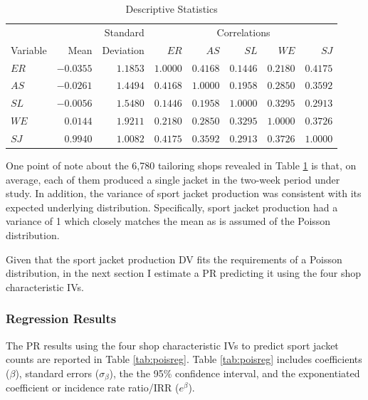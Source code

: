 \documentclass[man]{apa7}
\begin{document}
	\begin{table}[h!]
		\centering
		\caption{\centering Descriptive Statistics} 
		\begin{tabular}{lrr|rrrrr}
			\hline %
			&  & Standard & \multicolumn{5}{c}{Correlations} \\ 
			Variable & Mean & Deviation & $ER$ & $AS$ & $SL$ & $WE$ & $SJ$ \\ 
			\hline %
			$ER$ & $-0.0355$ & $1.1853$ & $1.0000$ & $0.4168$ & $0.1446$ & $0.2180$ & $0.4175$ \\ 
			$AS$ & $-0.0261$ & $1.4494$ & $0.4168$ & $1.0000$ & $0.1958$ & $0.2850$ & $0.3592$ \\ 
			$SL$ & $-0.0056$ & $1.5480$ & $0.1446$ & $0.1958$ & $1.0000$ & $0.3295$ & $0.2913$ \\ 
			$WE$ & $0.0144$ & $1.9211$ & $0.2180$ & $0.2850$ & $0.3295$ & $1.0000$ & $0.3726$ \\ 
			$SJ$ & $0.9940$ & $1.0082$ & $0.4175$ & $0.3592$ & $0.2913$ & $0.3726$ & $1.0000$ \\ 
			\hline %
		\end{tabular}
		\label{tab:desc}
	\end{table}

	One point of note about the 6,780 tailoring shops revealed in Table \ref{tab:desc} is that, on average, each of them produced a single jacket in the two-week period under study.
	In addition, the variance of sport jacket production was consistent with its expected underlying distribution.
	Specifically, sport jacket production had a variance of 1 which closely matches the mean as is assumed of the Poisson distribution. 
	
	Given that the sport jacket production DV fits the requirements of a Poisson distribution, in the next section I estimate a PR predicting it using the four shop characteristic IVs.

		\subsubsection{Regression Results}
		
	The PR results using the four shop characteristic IVs to predict sport jacket counts are reported in Table \ref{tab:poisreg}. 
	Table \ref{tab:poisreg} includes coefficients ($\beta$), standard errors ($\sigma_{\beta}$), the the 95\% confidence interval, and the exponentiated coefficient or incidence rate ratio/IRR ($e^{\beta}$).
	
\end{document}

